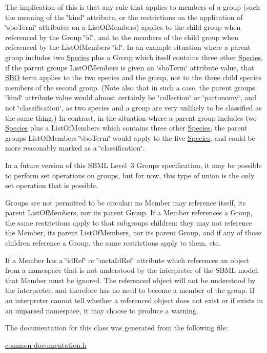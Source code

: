 The implication of this is that any rule that applies to members of a group (such the meaning of the \char`\"{}kind\char`\"{} attribute, or the restrictions on the application of \char`\"{}sbo\+Term\char`\"{} attributes on a List\+Of\+Members) applies to the child group when referenced by the Group \char`\"{}id\char`\"{}, and to the members of the child group when referenced by the List\+Of\+Members \char`\"{}id\char`\"{}. In an example situation where a parent group includes two \hyperlink{class_species}{Species} plus a Group which itself contains three other \hyperlink{class_species}{Species}, if the parent group\textquotesingle{}s List\+Of\+Members is given an \char`\"{}sbo\+Term\char`\"{} attribute value, that \hyperlink{class_s_b_o}{S\+BO} term applies to the two species and the group, not to the three child species members of the second group. (Note also that in such a case, the parent group\textquotesingle{}s \char`\"{}kind\char`\"{} attribute value would almost certainly be {\ttfamily \char`\"{}collection\char`\"{}} or {\ttfamily \char`\"{}partonomy\char`\"{}}, and not {\ttfamily \char`\"{}classification\char`\"{}}, as two species and a group are very unlikely to be classified as the same thing.) In contrast, in the situation where a parent group includes two \hyperlink{class_species}{Species} plus a List\+Of\+Members which contains three other \hyperlink{class_species}{Species}, the parent group\textquotesingle{}s List\+Of\+Members \char`\"{}sbo\+Term\char`\"{} would apply to the five \hyperlink{class_species}{Species}, and could be more reasonably marked as a {\ttfamily \char`\"{}classification\char`\"{}}.

In a future version of this S\+B\+ML Level~3 Groups specification, it may be possible to perform set operations on groups, but for now, this type of union is the only set operation that is possible.

Groups are not permitted to be circular\+: no Member may reference itself, its parent List\+Of\+Members, nor its parent Group. If a Member references a Group, the same restrictions apply to that subgroup\textquotesingle{}s children\+: they may not reference the Member, its parent List\+Of\+Members, nor its parent Group, and if any of those children reference a Group, the same restrictions apply to them, etc.

If a Member has a \char`\"{}id\+Ref\char`\"{} or \char`\"{}meta\+Id\+Ref\char`\"{} attribute which references an object from a namespace that is not understood by the interpreter of the S\+B\+ML model, that Member must be ignored. The referenced object will not be understood by the interpreter, and therefore has no need to become a member of the group. If an interpreter cannot tell whether a referenced object does not exist or if exists in an unparsed namespace, it may choose to produce a warning. 

The documentation for this class was generated from the following file\+:\begin{DoxyCompactItemize}
\item 
\hyperlink{common-documentation_8h}{common-\/documentation.\+h}\end{DoxyCompactItemize}
